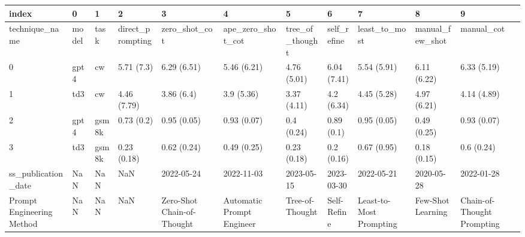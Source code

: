 \begin{tabular}{lllllllllll}
\toprule
index & 0 & 1 & 2 & 3 & 4 & 5 & 6 & 7 & 8 & 9 \\
\midrule
technique_name & model & task & direct_prompting & zero_shot_cot & ape_zero_shot_cot & tree_of_thought & self_refine & least_to_most & manual_few_shot & manual_cot \\
0 & gpt4 & cw & 5.71 (7.3) & 6.29 (6.51) & 5.46 (6.21) & 4.76 (5.01) & 6.04 (7.41) & 5.54 (5.91) & 6.11 (6.22) & 6.33 (5.19) \\
1 & td3 & cw & 4.46 (7.79) & 3.86 (6.4) & 3.9 (5.36) & 3.37 (4.11) & 4.2 (6.34) & 4.45 (5.28) & 4.97 (6.21) & 4.14 (4.89) \\
2 & gpt4 & gsm8k & 0.73 (0.2) & 0.95 (0.05) & 0.93 (0.07) & 0.4 (0.24) & 0.89 (0.1) & 0.95 (0.05) & 0.49 (0.25) & 0.93 (0.07) \\
3 & td3 & gsm8k & 0.23 (0.18) & 0.62 (0.24) & 0.49 (0.25) & 0.23 (0.18) & 0.2 (0.16) & 0.67 (0.95) & 0.18 (0.15) & 0.6 (0.24) \\
ss_publication_date & NaN & NaN & NaN & 2022-05-24 & 2022-11-03 & 2023-05-15 & 2023-03-30 & 2022-05-21 & 2020-05-28 & 2022-01-28 \\
Prompt Engineering Method & NaN & NaN & NaN & Zero-Shot Chain-of-Thought & Automatic Prompt Engineer & Tree-of-Thought & Self-Refine & Least-to-Most Prompting & Few-Shot Learning & Chain-of-Thought Prompting \\
\bottomrule
\end{tabular}
